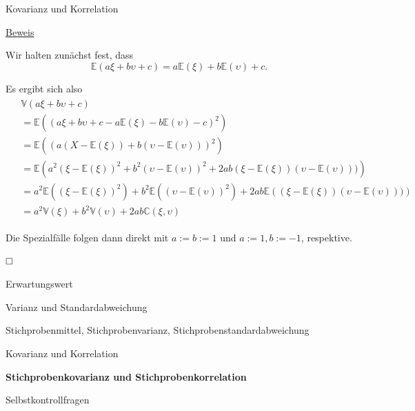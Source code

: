 \documentclass[
  8pt,
  ignorenonframetext,
]{beamer}
\newcommand{\ups}{\upsilon}
\begin{document}
\begin{frame}{Kovarianz und Korrelation}
\protect\hypertarget{kovarianz-und-korrelation-8}{}
\footnotesize

\underline{Beweis} \vspace{2mm}

Wir halten zunächst fest, dass \begin{equation}
\mathbb{E}(a\xi + b\ups + c) = a\mathbb{E}(\xi) + b\mathbb{E}(\ups) + c.
\end{equation}

Es ergibt sich also \begin{align}
\begin{split}
& \mathbb{V}(a\xi + b\ups + c)                                                              \\
& = \mathbb{E}\left((a\xi + b\ups + c - a\mathbb{E}(\xi) - b\mathbb{E}(\ups) - c)^2\right)  \\
& = \mathbb{E}\left((a(X  - \mathbb{E}(\xi)) + b(\ups  - \mathbb{E}(\ups)))^2\right)        \\
& = \mathbb{E}\left(a^2(\xi - \mathbb{E}(\xi))^2
                  + b^2(\ups - \mathbb{E}(\ups))^2
                  + 2ab(\xi - \mathbb{E}(\xi))(\ups - \mathbb{E}(\ups)))\right)                 \\
& = a^2\mathbb{E}\left((\xi - \mathbb{E}(\xi))^2\right)
  + b^2\mathbb{E}\left((\ups - \mathbb{E}(\ups))^2\right)
  + 2ab\mathbb{E}\left((\xi - \mathbb{E}(\xi))(\ups - \mathbb{E}(\ups)))\right)                 \\
& = a^2\mathbb{V}(\xi)+ b^2\mathbb{V}(\ups) + 2ab\mathbb{C}(\xi,\ups)
\end{split}
\end{align}

Die Spezialfälle folgen dann direkt mit \(a := b := 1\) und
\(a := 1, b := -1\), respektive.

\(\hfill \Box\)
\end{frame}

\begin{frame}{}
\protect\hypertarget{section-9}{}
\large
\vfill

Erwartungswert

Varianz und Standardabweichung

Stichprobenmittel, Stichprobenvarianz, Stichprobenstandardabweichung

Kovarianz und Korrelation

\textbf{Stichprobenkovarianz und Stichprobenkorrelation}

Selbstkontrollfragen \vfill
\end{frame}
\end{document}
